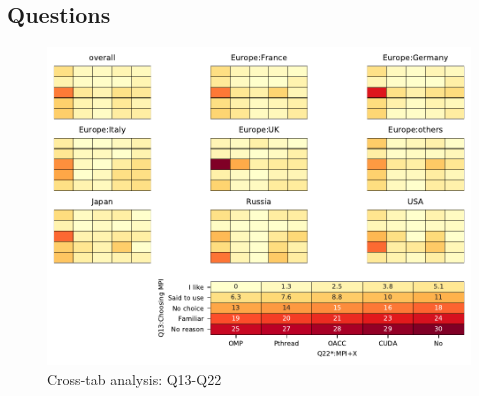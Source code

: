 
\subsection{Questions}


\begin{figure}
\begin{center}
\includegraphics[width=12cm]{../pdfs/Q13-Q22.pdf}
\caption{Cross-tab analysis: Q13-Q22}
\label{fig:Q13-Q22}
\end{center}
\end{figure}
